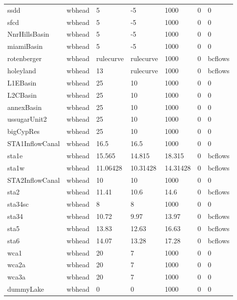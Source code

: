 \begin{table}[!htb]
\begin{center}
\begin{tabular}{p{2.3cm}p{1.8cm}p{1.8cm}p{1.8cm}p{1.8cm}p{1.8cm}p{1.8cm}}
  ssdd            &wbhead      & 5        & -5       & 1000     & 0       & 0       \\
  sfcd            &wbhead      & 5        & -5       & 1000     & 0       & 0       \\
  NnrHillsBasin   &wbhead      & 5        & -5       & 1000     & 0       & 0       \\
  miamiBasin      &wbhead      & 5        & -5       & 1000     & 0       & 0       \\
  rotenberger     &wbhead      &rulecurve &rulecurve & 1000     & 0       &bcflows  \\
  holeyland       &wbhead      & 13       &rulecurve & 1000     & 0       &bcflows  \\
  L1EBasin        &wbhead      & 25       & 10       & 1000     & 0       & 0       \\
  L2CBasin        &wbhead      & 25       & 10       & 1000     & 0       & 0       \\
  annexBasin      &wbhead      & 25       & 10       & 1000     & 0       & 0       \\
  ussugarUnit2    &wbhead      & 25       & 10       & 1000     & 0       & 0       \\
  bigCypRes       &wbhead      & 25       & 10       & 1000     & 0       & 0       \\
  STA1InflowCanal &wbhead      & 16.5     & 16.5     & 1000     & 0       & 0       \\
  sta1e           &wbhead      & 15.565   & 14.815   & 18.315   & 0       &bcflows  \\
  sta1w           &wbhead      & 11.06428 & 10.31428 & 14.31428 & 0       &bcflows  \\
  STA2InflowCanal &wbhead      & 10       & 10       & 1000     & 0       & 0       \\
  sta2            &wbhead      & 11.41    & 10.6     & 14.6     & 0       &bcflows  \\
  sta34sc         &wbhead      & 8        & 8        & 1000     & 0       & 0       \\
  sta34           &wbhead      & 10.72    & 9.97     & 13.97    & 0       &bcflows  \\
  sta5            &wbhead      & 13.83    & 12.63    & 16.63    & 0       &bcflows  \\
  sta6            &wbhead      & 14.07    & 13.28    & 17.28    & 0       &bcflows  \\
  wca1            &wbhead      & 20       & 7        & 1000     & 0       & 0       \\
  wca2a           &wbhead      & 20       & 7        & 1000     & 0       & 0       \\
  wca3a           &wbhead      & 20       & 7        & 1000     & 0       & 0       \\
  dummyLake       &wbhead      & 0        & 0        & 1000     & 0       & 0       \\
  \hline
  \end{tabular}
 \end{center}
\end{table}
\normalsize

